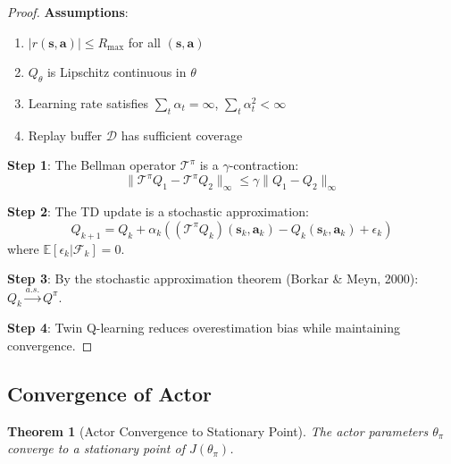 \documentclass[11pt,a4paper]{article}
\newtheorem{theorem}{Theorem}[section]
\newcommand{\E}{\mathbb{E}}
\newcommand{\calD}{\mathcal{D}}
\newcommand{\calT}{\mathcal{T}}
\newcommand{\bs}{\mathbf{s}}
\newcommand{\ba}{\mathbf{a}}
\begin{document}
\begin{proof}
\textbf{Assumptions}:
\begin{enumerate}
    \item[(A1)] $|r(\bs, \ba)| \leq R_{\max}$ for all $(\bs, \ba)$
    \item[(A2)] $Q_\theta$ is Lipschitz continuous in $\theta$
    \item[(A3)] Learning rate satisfies $\sum_t \alpha_t = \infty$, $\sum_t \alpha_t^2 < \infty$
    \item[(A4)] Replay buffer $\calD$ has sufficient coverage
\end{enumerate}

\textbf{Step 1}: The Bellman operator $\calT^\pi$ is a $\gamma$-contraction:
\begin{equation}
    \|\calT^\pi Q_1 - \calT^\pi Q_2\|_\infty \leq \gamma \|Q_1 - Q_2\|_\infty
\end{equation}

\textbf{Step 2}: The TD update is a stochastic approximation:
\begin{equation}
    Q_{k+1} = Q_k + \alpha_k ((\calT^\pi Q_k)(\bs_k, \ba_k) - Q_k(\bs_k, \ba_k) + \epsilon_k)
\end{equation}
where $\E[\epsilon_k | \mathcal{F}_k] = 0$.

\textbf{Step 3}: By the stochastic approximation theorem (Borkar \& Meyn, 2000): $Q_k \xrightarrow{a.s.} Q^\pi$.

\textbf{Step 4}: Twin Q-learning reduces overestimation bias while maintaining convergence.
\end{proof}

\subsection{Convergence of Actor}

\begin{theorem}[Actor Convergence to Stationary Point]
\label{thm:actor}
The actor parameters $\theta_\pi$ converge to a stationary point of $J(\theta_\pi)$.
\end{theorem}
\end{document}
